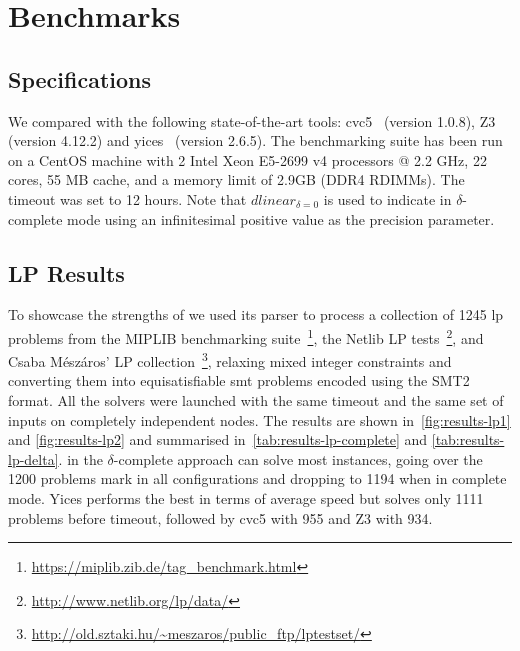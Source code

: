 \documentclass[runningheads]{llncs}
\begin{document}
\section{Benchmarks}
\label{sec:benchmarks}
\subsection*{Specifications}

We compared \dlinear with the following state-of-the-art tools: cvc5~\cite{ref:cvc5} (version 1.0.8), Z3~\cite{ref:z3} (version 4.12.2) and yices~\cite{ref:yices} (version 2.6.5).
The benchmarking suite has been run on a CentOS machine with 2 Intel Xeon E5-2699 v4 processors @ 2.2 GHz, 22 cores, 55 MB cache, and a memory limit of 2.9GB (DDR4 RDIMMs).
The timeout was set to 12 hours.
Note that $dlinear_{\delta = 0}$ is used to indicate \dlinear in $\delta$-complete mode using an infinitesimal positive value as the precision parameter.

\subsection*{LP Results}

To showcase the strengths of \dlinear we used its parser to process a collection of 1245 \gls{lp} problems from the MIPLIB benchmarking suite~\footnote{\url{https://miplib.zib.de/tag_benchmark.html}}, the Netlib LP tests~\footnote{\url{http://www.netlib.org/lp/data/}}, and Csaba Mészáros' LP collection~\footnote{\url{http://old.sztaki.hu/~meszaros/public_ftp/lptestset/}}, relaxing mixed integer constraints and converting them into equisatisfiable \gls{smt} problems encoded using the SMT2 format.
All the solvers were launched with the same timeout and the same set of inputs on completely independent nodes.
The results are shown in~\autoref{fig:results-lp1} and \autoref{fig:results-lp2} and summarised in~\autoref{tab:results-lp-complete} and \autoref{tab:results-lp-delta}.
\dlinear in the $\delta$-complete approach can solve most instances, going over the 1200 problems mark in all configurations and dropping to 1194 when in complete mode.
Yices performs the best in terms of average speed but solves only 1111 problems before timeout, followed by cvc5 with 955 and Z3 with 934.
\end{document}
